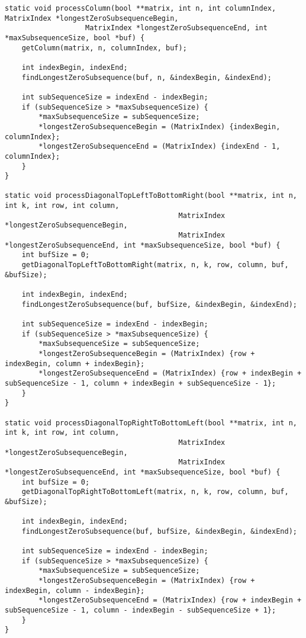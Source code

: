 \documentclass[a4paper, 12pt, oneside]{article}
\begin{document}
\begin{verbatim}
static void processColumn(bool **matrix, int n, int columnIndex, MatrixIndex *longestZeroSubsequenceBegin,
                   MatrixIndex *longestZeroSubsequenceEnd, int *maxSubsequenceSize, bool *buf) {
    getColumn(matrix, n, columnIndex, buf);

    int indexBegin, indexEnd;
    findLongestZeroSubsequence(buf, n, &indexBegin, &indexEnd);

    int subSequenceSize = indexEnd - indexBegin;
    if (subSequenceSize > *maxSubsequenceSize) {
        *maxSubsequenceSize = subSequenceSize;
        *longestZeroSubsequenceBegin = (MatrixIndex) {indexBegin, columnIndex};
        *longestZeroSubsequenceEnd = (MatrixIndex) {indexEnd - 1, columnIndex};
    }
}

static void processDiagonalTopLeftToBottomRight(bool **matrix, int n, int k, int row, int column,
                                         MatrixIndex *longestZeroSubsequenceBegin,
                                         MatrixIndex *longestZeroSubsequenceEnd, int *maxSubsequenceSize, bool *buf) {
    int bufSize = 0;
    getDiagonalTopLeftToBottomRight(matrix, n, k, row, column, buf, &bufSize);

    int indexBegin, indexEnd;
    findLongestZeroSubsequence(buf, bufSize, &indexBegin, &indexEnd);

    int subSequenceSize = indexEnd - indexBegin;
    if (subSequenceSize > *maxSubsequenceSize) {
        *maxSubsequenceSize = subSequenceSize;
        *longestZeroSubsequenceBegin = (MatrixIndex) {row + indexBegin, column + indexBegin};
        *longestZeroSubsequenceEnd = (MatrixIndex) {row + indexBegin + subSequenceSize - 1, column + indexBegin + subSequenceSize - 1};
    }
}

static void processDiagonalTopRightToBottomLeft(bool **matrix, int n, int k, int row, int column,
                                         MatrixIndex *longestZeroSubsequenceBegin,
                                         MatrixIndex *longestZeroSubsequenceEnd, int *maxSubsequenceSize, bool *buf) {
    int bufSize = 0;
    getDiagonalTopRightToBottomLeft(matrix, n, k, row, column, buf, &bufSize);

    int indexBegin, indexEnd;
    findLongestZeroSubsequence(buf, bufSize, &indexBegin, &indexEnd);

    int subSequenceSize = indexEnd - indexBegin;
    if (subSequenceSize > *maxSubsequenceSize) {
        *maxSubsequenceSize = subSequenceSize;
        *longestZeroSubsequenceBegin = (MatrixIndex) {row + indexBegin, column - indexBegin};
        *longestZeroSubsequenceEnd = (MatrixIndex) {row + indexBegin + subSequenceSize - 1, column - indexBegin - subSequenceSize + 1};
    }
}


\end{verbatim}
\end{document}

